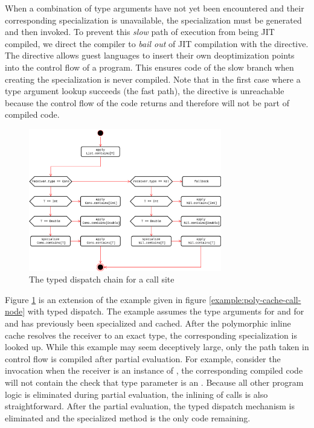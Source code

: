 When a combination of type arguments have not yet been encountered and their corresponding specialization is unavailable, the specialization must be generated and then invoked.
To prevent this \textit{slow} path of execution from being JIT compiled, we direct the compiler to \textit{bail out} of JIT compilation with the  directive.
The directive allows guest languages to insert their own deoptimization points into the control flow of a program.
This ensures code of the slow branch when creating the specialization is never compiled.
Note that in the first case where a type argument lookup succeeds (the fast path), the directive is unreachable because the control flow of the code returns and therefore will not be part of compiled code.

\begin{figure}[!htb]
	\centering
	\includegraphics[width=0.75\textwidth]{figures/tastytruffle-type-dispatch-chain.png}
	\caption{The typed dispatch chain for a  call site}
	\label{example:typed-dispatch}
\end{figure}

Figure \ref{example:typed-dispatch} is an extension of the example given in figure \ref{example:poly-cache-call-node} with typed dispatch.
The example assumes the type arguments for  and  for  and  has previously been specialized and cached.
After the polymorphic inline cache resolves the receiver to an exact type, the corresponding specialization is looked up.
While this example may seem deceptively large, only the path taken in control flow is compiled after partial evaluation.
For example, consider the invocation  when the receiver is an instance of , the corresponding compiled code will not contain the check that type parameter is an .
Because all other program logic is eliminated during partial evaluation, the inlining of calls is also straightforward.
After the partial evaluation, the typed dispatch mechanism is eliminated and the specialized method is the only code remaining.

